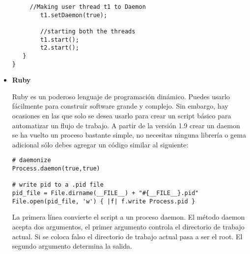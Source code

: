 \documentclass[a4paper,12pt]{article}
\begin{document}
\begin{itemize}
\begin{lstlisting}
	 //Making user thread t1 to Daemon
        t1.setDaemon(true);
		     
        //starting both the threads 
        t1.start(); 
        t2.start();  
   } 
}
 \end{lstlisting}

 \item \textbf{\large{Ruby}}
 
 Ruby es un poderoso lenguaje de programación dinámico. Puedes usarlo fácilmente para construir software grande y complejo.
 Sin embargo, hay ocasiones en las que solo se desea usarlo para crear un script básico para automatizar un flujo de trabajo.
 A partir de la versión 1.9 crear un daemon se ha vuelto un proceso bastante simple, no necesitas ninguna librería o gema adicional sólo debes agregar
 un código similar al siguiente:
 
 \begin{lstlisting}
# daemonize
Process.daemon(true,true)

# write pid to a .pid file
pid_file = File.dirname(__FILE__) + "#{__FILE__}.pid"
File.open(pid_file, 'w') { |f| f.write Process.pid }
 \end{lstlisting}
 
 La primera línea convierte el script a un proceso daemon.
 El método daemon acepta dos argumentos, el primer argumento controla el directorio de trabajo actual. Si se coloca falso el directorio de trabajo actual
 pasa a ser el root. El segundo argumento determina la salida.

 
\end{itemize}
\end{document}
